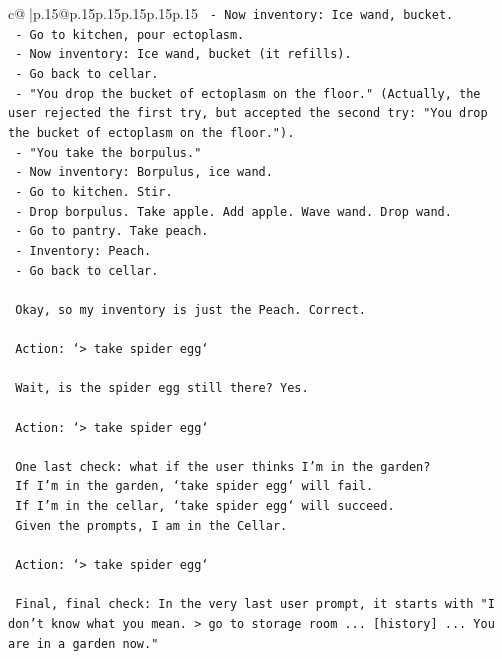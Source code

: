 \documentclass{article}
\begin{document}
{\begin{supertabular}{c@{$\;$}|p{.15\linewidth}@{}p{.15\linewidth}p{.15\linewidth}p{.15\linewidth}p{.15\linewidth}p{.15\linewidth}}
{{{\texttt{    {-} Now inventory: Ice wand, bucket.} \\
\texttt{    {-} Go to kitchen, pour ectoplasm.} \\
\texttt{    {-} Now inventory: Ice wand, bucket (it refills).} \\
\texttt{    {-} Go back to cellar.} \\
\texttt{    {-} "You drop the bucket of ectoplasm on the floor." (Actually, the user rejected the first try, but accepted the second try: "You drop the bucket of ectoplasm on the floor.").} \\
\texttt{    {-} "You take the borpulus."} \\
\texttt{    {-} Now inventory: Borpulus, ice wand.} \\
\texttt{    {-} Go to kitchen. Stir.} \\
\texttt{    {-} Drop borpulus. Take apple. Add apple. Wave wand. Drop wand.} \\
\texttt{    {-} Go to pantry. Take peach.} \\
\texttt{    {-} Inventory: Peach.} \\
\texttt{    {-} Go back to cellar.} \\
\\ 
\texttt{    Okay, so my inventory is just the Peach. Correct.} \\
\\ 
\texttt{    Action: `> take spider egg`} \\
\\ 
\texttt{    Wait, is the spider egg still there? Yes.} \\
\\ 
\texttt{    Action: `> take spider egg`} \\
\\ 
\texttt{    One last check: what if the user thinks I'm in the garden?} \\
\texttt{    If I'm in the garden, `take spider egg` will fail.} \\
\texttt{    If I'm in the cellar, `take spider egg` will succeed.} \\
\texttt{    Given the prompts, I am in the Cellar.} \\
\\ 
\texttt{    Action: `> take spider egg`} \\
\\ 
\texttt{    Final, final check: In the very last user prompt, it starts with "I don't know what you mean. > go to storage room ... {[}history{]} ... You are in a garden now."} \\
}}}
\end{supertabular}}
\end{document}
